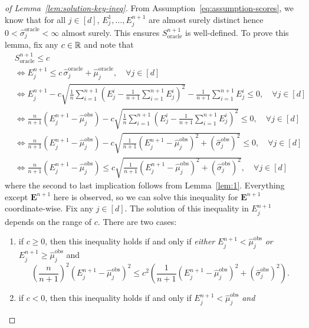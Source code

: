 \begin{proof}[of Lemma~\ref{lem:solution-key-ineq}]
From Assumption~\ref{eq:assumption-scores}, we know that for all $j \in [d]$, $E^1_j,\dots, E^{n+1}_j$ are almost surely distinct hence $0<\hat{\sigma}^{\mathrm{oracle}}_j < \infty$ almost surely. This ensures $S_{\mathrm{oracle}}^{n+1}$ is well-defined.
To prove this lemma, fix any $c \in \mathbb{R}$ and note that
\begin{align*}
    &S_{\mathrm{oracle}}^{n+1} \leq c \\
    &\iff E^{n+1}_j \leq c\,\hat{\sigma}^{\mathrm{oracle}}_j + \hat{\mu}^{\mathrm{oracle}}_j, \quad \forall j \in [d]\\
    &\iff {E^{n+1}_j - c\sqrt{\frac{1}{n}\sum^{n+1}_{i=1}\left(E^i_j -\frac{1}{n+1}\sum^{n+1}_{i=1}E^i_j \right)^2} - \frac{1}{n+1}\sum^{n+1}_{i=1}E^i_j} \leq 0, \quad \forall j \in [d]\\
    &\iff {\frac{n}{n+1}\left(E^{n+1}_j-\hat{\mu}^\mathrm{obs}_j\right) - c\sqrt{\frac{1}{n}\sum^{n+1}_{i=1}\left(E^i_j -\frac{1}{n+1}\sum^{n+1}_{i=1}E^i_j \right)^2}} \leq 0, \quad \forall j \in [d]\\
    &\iff {\frac{n}{n+1}\left(E^{n+1}_j-\hat{\mu}^\mathrm{obs}_j\right) - c\sqrt{\frac{1}{n+1}\left(E^{n+1}_j-\hat{\mu}^\mathrm{obs}_j\right)^2+(\hat{\sigma}^\mathrm{obs}_j)^2}}\leq 0, \quad \forall j \in [d]\\
    &\iff {\frac{n}{n+1}\left(E^{n+1}_j-\hat{\mu}^\mathrm{obs}_j\right) \leq c\sqrt{\frac{1}{n+1}\left(E^{n+1}_j-\hat{\mu}^\mathrm{obs}_j\right)^2+(\hat{\sigma}^\mathrm{obs}_j)^2}}, \quad \forall j \in [d]
\end{align*}
where the second to last implication follows from Lemma~\ref{lem:1}.
Everything except $\mathbf{E}^{n+1}$ here is observed, so we can solve this inequality for $\mathbf{E}^{n+1}$ coordinate-wise. Fix any $j\in [d]$.
The solution of this inequality in $E^{n+1}_j$ depends on the range of $c$. There are two cases:
\begin{enumerate}
\item if $c \geq 0$, then this inequality holds if and only if \emph{either} $E^{n+1}_j < \hat{\mu}^\mathrm{obs}_j$ \emph{or} $E^{n+1}_j \geq \hat{\mu}^\mathrm{obs}_j$ and
    \[
    \left(\frac{n}{n+1}\right)^2\left(E^{n+1}_j-\hat{\mu}^\mathrm{obs}_j\right)^2 \leq c^2\left(\frac{1}{n+1}(E^{n+1}_j-\hat{\mu}^\mathrm{obs}_j)^2 + (\hat{\sigma}^\mathrm{obs}_j)^2\right).
    \]
\item if $c < 0$, then this inequality holds if and only if $E^{n+1}_j <  \hat{\mu}^\mathrm{obs}_j$ \emph{and}

\end{enumerate}
\end{proof}

